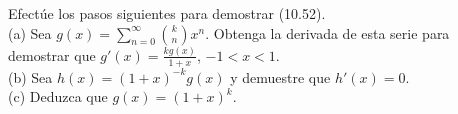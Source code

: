 \item Efectúe los pasos siguientes para demostrar (10.52). \\
    (a) Sea $g(x) = \sum_{n=0}^\infty \binom{k}{n} x^n$. Obtenga la derivada de esta serie para demostrar que $g'(x) = \frac{kg(x)}{1+x}$, $-1 < x < 1$. \\
    (b) Sea $h(x) = (1+x)^{-k}g(x)$ y demuestre que $h'(x) = 0$. \\
    (c) Deduzca que $g(x) = (1+x)^k$.
